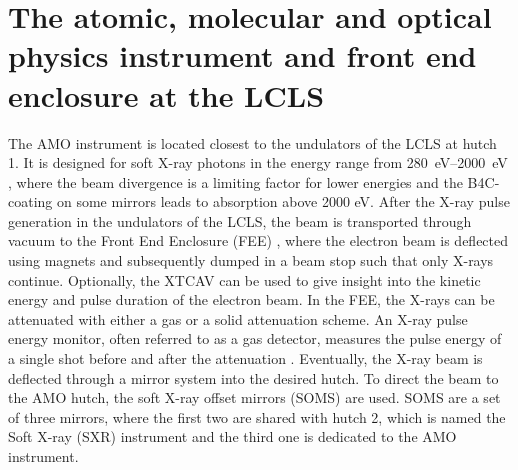 \section[The AMO instrument and FEE at the LCLS]{The atomic, molecular and optical physics instrument and front end enclosure at the LCLS}\label{sec:amo-instrument}
The AMO instrument is located closest to the undulators of the LCLS at hutch 1. It is designed for soft X-ray photons in the energy range from \SIrange{280}{2000}{\electronvolt} \citep{Ferguson-2015-JSR,Bozek-2009-EPJST}, where the beam divergence is a limiting factor for lower energies and the B4C-coating on some mirrors leads to absorption above 2000 eV. After the X-ray pulse generation in the undulators of the LCLS, the beam is transported through vacuum to the Front End Enclosure (FEE) \citep{Moeller-2011-NIMPR}, where the electron beam is deflected using magnets and subsequently dumped in a beam stop such that only X-rays continue. Optionally, the XTCAV \citep{Behrens-2014-NatCom} can be used to give insight into the kinetic energy and pulse duration of the electron beam. In the FEE, the X-rays can be attenuated with either a gas or a solid attenuation scheme. An X-ray pulse energy monitor, often referred to as a gas detector, measures the pulse energy of a single shot before and after the attenuation \citep{Hau-Riege-2010-PRL-2}. Eventually, the X-ray beam is deflected through a mirror system into the desired hutch. To direct the beam to the AMO hutch, the soft X-ray offset mirrors (SOMS) are used. SOMS are a set of three mirrors, where the first two are shared with hutch 2, which is named the Soft X-ray (SXR) instrument \citep{Schlotter-2012-RSI,Soufli-2012-AppOpt,Dakovski-2015-JSR} and the third one is dedicated to the AMO instrument.
